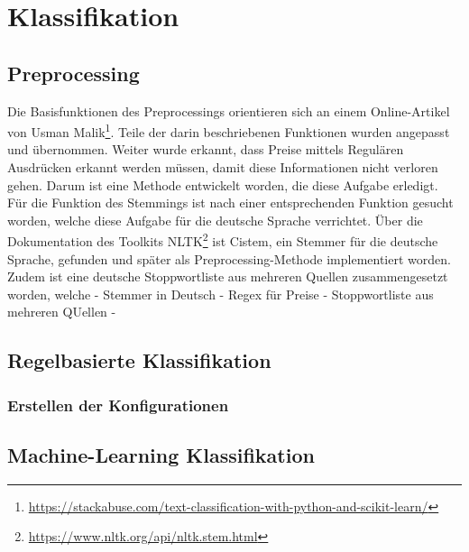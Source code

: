 \section{Klassifikation}
\subsection{Preprocessing}
Die Basisfunktionen des Preprocessings orientieren sich an einem Online-Artikel von Usman Malik\footnote{\url{https://stackabuse.com/text-classification-with-python-and-scikit-learn/}}.
Teile der darin beschriebenen Funktionen wurden angepasst und übernommen.
Weiter wurde erkannt, dass Preise mittels Regulären Ausdrücken erkannt werden müssen, damit diese Informationen nicht verloren gehen.
Darum ist eine Methode entwickelt worden, die diese Aufgabe erledigt.
Für die Funktion des Stemmings ist nach einer entsprechenden Funktion gesucht worden, welche diese Aufgabe für die deutsche Sprache verrichtet.
Über die Dokumentation des Toolkits NLTK\footnote{\url{https://www.nltk.org/api/nltk.stem.html}} ist Cistem, ein Stemmer für die deutsche Sprache, gefunden und später als Preprocessing-Methode implementiert worden.
Zudem ist eine deutsche Stoppwortliste aus mehreren Quellen zusammengesetzt worden, welche 
- Stemmer in Deutsch
- Regex für Preise
- Stoppwortliste aus mehreren QUellen
- 
\subsection{Regelbasierte Klassifikation}
\subsubsection{Erstellen der Konfigurationen}
\subsection{Machine-Learning Klassifikation}

